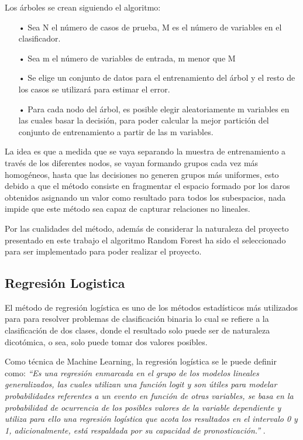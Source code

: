 Los árboles se crean siguiendo el algoritmo:


\begin{itemize}
\item[•] Sea N el número de casos de prueba, M es el número de variables en el clasificador.
\item[•] Sea m el número de variables de entrada, m menor que M
\item[•] Se elige un conjunto de datos para el entrenamiento del árbol y el resto de los casos se utilizará para estimar el error.
\item[•] Para cada nodo del árbol, es posible elegir aleatoriamente m variables en las cuales basar la decisión, para poder calcular la mejor partición del conjunto de entrenamiento a partir de las m variables.
\end{itemize}

La idea es que a medida que se vaya separando la muestra de entrenamiento a través de los diferentes nodos, se vayan formando grupos cada vez más homogéneos, hasta que las decisiones no generen grupos más uniformes, esto debido a que el método consiste en fragmentar el espacio formado por los daros obtenidos asignando un valor como resultado para todos los subespacios, nada impide que este método sea capaz de capturar relaciones no lineales.

Por las cualidades del método, además de considerar la naturaleza del proyecto presentado en este trabajo el algoritmo Random Forest ha sido el seleccionado para ser implementado para poder realizar el proyecto.

\subsection{Regresión Logistica}

El método de regresión logística es uno de los métodos estadísticos más utilizados para para resolver problemas de clasificación binaria lo cual se refiere a la clasificación de dos clases, donde el resultado solo puede ser de naturaleza dicotómica, o sea, solo puede tomar dos valores posibles.

Como técnica de Machine Learning, la regresión logística se le puede definir como: \textit{“Es una regresión enmarcada en el grupo de los modelos lineales generalizados, las cuales utilizan una función logit y son útiles para modelar probabilidades referentes a un evento en función de otras variables, se basa en la probabilidad de ocurrencia de los posibles valores de la variable dependiente y utiliza para ello una regresión logística que acota los resultados en el intervalo 0 y 1, adicionalmente, está respaldada por su capacidad de pronosticación.”} \cite{AlbaVega2020Apr}.

